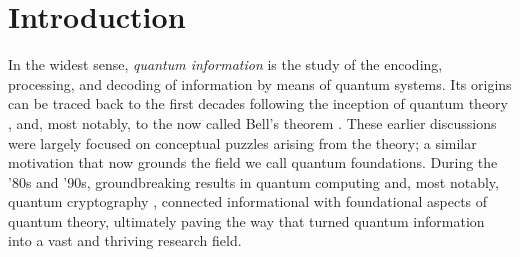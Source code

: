 \chapter*{Introduction}
\thispagestyle{empty}
\label{chap:introduction}

In the widest sense, \emph{quantum information} is the study of the encoding, processing, and decoding of information by means of quantum systems. Its origins can be traced back to the first decades following the inception of quantum theory \cite{epr,schrodinger_entanglement_1935,bohm_hiddenvariables_1952}, and, most notably, to the now called Bell's theorem \cite{bell_1964}. These earlier discussions were largely focused on conceptual puzzles arising from the theory; a similar motivation that now grounds the field we call quantum foundations. During the '80s and '90s, groundbreaking results in quantum computing and, most notably, quantum cryptography \cite{bb84,ekert91}, connected informational with foundational aspects of quantum theory, ultimately paving the way that turned quantum information into a vast and thriving research field.

